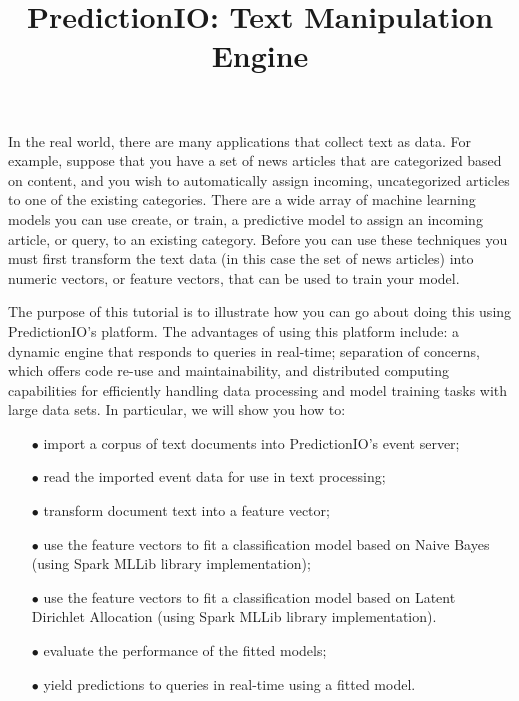 \documentclass[a4paper,12pt]{article}
\renewcommand{\bf}[1]{\textbf{#1}}
\newcommand{\3}{\left}
\newcommand{\4}{\right}
\renewcommand{\-}[1]{{}^{-#1}}
\begin{document}
\title{\vspace{-1.5 cm}\bf{PredictionIO: Text Manipulation Engine}}
\author{\vspace{-2cm}}
\date{}
\maketitle


In the real world, there are many applications that collect text as data. For example, suppose that you have a set of news articles that are categorized based on content, and you wish to automatically assign incoming, uncategorized articles to one of the existing categories. There are a wide array of machine learning models you can use create, or train, a predictive model to assign an incoming article, or query, to an existing category. Before you can use these techniques you must first transform the text data (in this case the set of news articles) into numeric vectors, or feature vectors, that can be used to train your model.

The purpose of this tutorial is to illustrate how you can go about doing this using PredictionIO's platform. The advantages of using this platform include: a dynamic engine that responds to queries in real-time; separation of concerns,
 which offers code re-use and maintainability, and distributed computing capabilities for efficiently handling data processing and model training tasks with large data sets. In particular, we will show you how to:

\begin{itemize}
\item[$\bullet$]{import a corpus of text documents into PredictionIO's event server;}

\item[$\bullet$]{read the imported event data for use in text processing;}

\item[$\bullet$]{transform document text into a feature vector;}

\item[$\bullet$]{use the feature vectors to fit a classification model based on Naive Bayes (using Spark MLLib library implementation);}

\item[$\bullet$]{use the feature vectors to fit a classification model based on Latent Dirichlet Allocation (using Spark MLLib library implementation).}

\item[$\bullet$]{evaluate the performance of the fitted models;}

\item[$\bullet$]{yield predictions to queries in real-time using a fitted model.}
\end{itemize}
\end{document}
